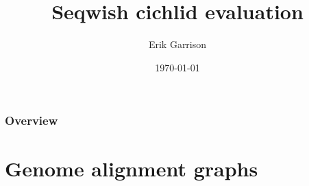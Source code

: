 \documentclass[aspectratio=169]{beamer}
\title[\textsc{seqwish} @ VGP informatics]{Seqwish cichlid evaluation} %
\author{Erik Garrison} %
\institute[UCSC] %
{
University of California, Santa Cruz \\ %
\medskip
\textit{erik.garrison@gmail.com} %
}
\date{\today} %
\begin{document}
\begin{frame}
\titlepage %
\end{frame}

\begin{frame}
\frametitle{Overview} %
\tableofcontents %
\end{frame}


\section{Genome alignment graphs} %

\end{document}
